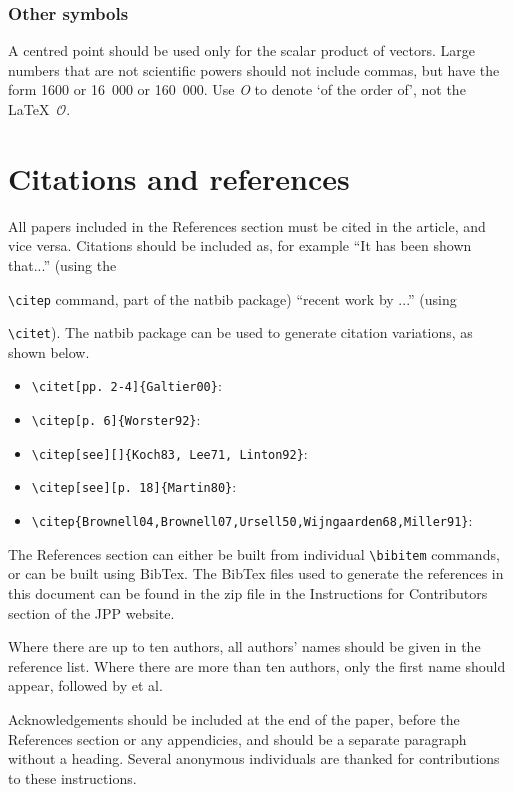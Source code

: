 \documentclass{jpp}
\begin{document}
\subsubsection{Other symbols}
A centred point should be used only for the scalar product of vectors.
Large numbers that are not scientific powers should not include commas, but have the
form 1600 or 16~000 or 160~000.
Use \textit{O} to denote `of the order of', not the \LaTeX\ $\mathcal{O}$.

\section{Citations and references}
All papers included in the References section must be cited in the article, and vice versa. Citations should be included as, for example ``It has been shown \citep{Rogallo81} that...'' (using the {\verb}\citep} command, part of the natbib package) ``recent work by \citet{Dennis85}...'' (using {\verb}\citet}).
The natbib package can be used to generate citation variations, as shown below.
\begin{itemize}
\item \verb#\citet[pp. 2-4]{Galtier00}#:
\citet[pp. 479-480]{Galtier00} 
\item \verb#\citep[p. 6]{Worster92}#:
\citep[p. 6]{Worster92}
\item \verb#\citep[see][]{Koch83, Lee71, Linton92}#:
\citep[see][]{Koch83, Lee71, Linton92}
\item \verb#\citep[see][p. 18]{Martin80}#:
\citep[see][p. 18]{Martin80}
\item \verb#\citep{Brownell04,Brownell07,Ursell50,Wijngaarden68,Miller91}#:
\citep{Brownell04,Brownell07,Ursell50,Wijngaarden68,Miller91}
\end{itemize}

The References section can either be built from individual \verb#\bibitem# commands, or can be built using BibTex. The BibTex files used to generate the references in this document can be found in the zip file in the Instructions for Contributors section of the JPP website.

Where there are up to ten authors, all authors' names should be given in the reference list. Where there are more than ten authors, only the first name should appear, followed by et al.

Acknowledgements should be included at the end of the paper, before the References section or any appendicies, and should be a separate paragraph without a heading. Several anonymous individuals are thanked for contributions to these instructions.

}}
\end{document}
